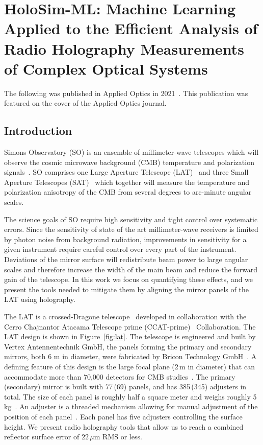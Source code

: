 \chapter{HoloSim-ML: Machine Learning Applied to the Efficient Analysis of Radio Holography Measurements of Complex Optical Systems}
\label{ch:holosim}
The following was published in Applied Optics in 2021~\cite{Chesmore:21}.  This publication was featured on the cover of the Applied Optics journal.
\section{Introduction}
Simons Observatory (SO) is an ensemble of millimeter-wave telescopes which will observe the cosmic microwave background (CMB) temperature and polarization signals~\cite{gali18, so19}. SO comprises one Large Aperture Telescope (LAT)~\cite{Niemack:16, Gudmundsson:21,Parshley_2018} and three Small Aperture Telescopes (SAT)~\cite{ali20} which together will measure the temperature and polarization anisotropy of the CMB from several degrees to arc-minute angular scales.

The science goals of SO require high sensitivity and tight control over systematic errors.  Since the sensitivity of state of the art millimeter-wave receivers is limited by photon noise from background radiation, improvements in sensitivity for a given instrument require careful control over every part of the instrument.  Deviations of the mirror surface will redistribute beam power to large angular scales and therefore increase the width of the main beam and reduce the forward gain of the telescope.  In this work we focus on quantifying these effects, and we present the tools needed to mitigate them by aligning the mirror panels of the LAT using holography.

The LAT is a crossed-Dragone telescope~\cite{6773968,Gudmundsson:21,Niemack:16,2021RNAAS...5..100X} developed in collaboration with the Cerro Chajnantor Atacama Telescope prime (CCAT-prime)~\cite{ccat,aravena2019ccatprime} Collaboration.  The LAT design is shown in Figure~\ref{fig:lat}.  The telescope is engineered and built by Vertex Antennentechnik GmbH, the panels forming the primary and secondary mirrors, both 6 m in diameter, were fabricated by Bricon Technology GmbH~\cite{vertex}.  A defining feature of this design is the large focal plane (2\,m in diameter) that can accommodate more than 70,000 detectors for CMB studies~\cite{Parshley_2018,zhu2021simons,mccarrick2021simons}. The primary\,(secondary) mirror is built with 77\,(69) panels, and has 385\,(345) adjusters in total.  The size of each panel is roughly half a square meter and weighs roughly 5\,kg~\cite{ccat}.  An adjuster is a threaded mechanism allowing for manual adjustment of the position of each panel~\cite{Woody}.  Each panel has five adjusters controlling the surface height.  We present radio holography tools that allow us to reach a combined reflector surface error of $22\,\mu$m RMS or less.

